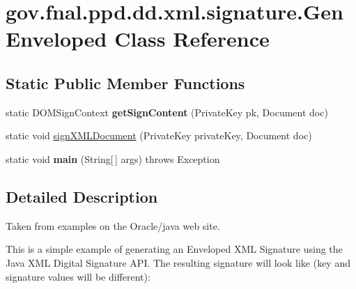\hypertarget{classgov_1_1fnal_1_1ppd_1_1dd_1_1xml_1_1signature_1_1GenEnveloped}{\section{gov.\-fnal.\-ppd.\-dd.\-xml.\-signature.\-Gen\-Enveloped Class Reference}
\label{classgov_1_1fnal_1_1ppd_1_1dd_1_1xml_1_1signature_1_1GenEnveloped}
}
\subsection*{Static Public Member Functions}
\begin{DoxyCompactItemize}
\item 
\hypertarget{classgov_1_1fnal_1_1ppd_1_1dd_1_1xml_1_1signature_1_1GenEnveloped_a14df81eeaa8d9607d12ae959e4f45cff}{static D\-O\-M\-Sign\-Context {\bfseries get\-Sign\-Content} (Private\-Key pk, Document doc)}\label{classgov_1_1fnal_1_1ppd_1_1dd_1_1xml_1_1signature_1_1GenEnveloped_a14df81eeaa8d9607d12ae959e4f45cff}

\item 
static void \hyperlink{classgov_1_1fnal_1_1ppd_1_1dd_1_1xml_1_1signature_1_1GenEnveloped_a86010943e39ea4f238731c3b6890033e}{sign\-X\-M\-L\-Document} (Private\-Key private\-Key, Document doc)
\item 
\hypertarget{classgov_1_1fnal_1_1ppd_1_1dd_1_1xml_1_1signature_1_1GenEnveloped_a16023580ac338dc85c74053b151ad680}{static void {\bfseries main} (String\mbox{[}$\,$\mbox{]} args)  throws Exception }\label{classgov_1_1fnal_1_1ppd_1_1dd_1_1xml_1_1signature_1_1GenEnveloped_a16023580ac338dc85c74053b151ad680}

\end{DoxyCompactItemize}


\subsection{Detailed Description}
Taken from examples on the Oracle/java web site.

This is a simple example of generating an Enveloped X\-M\-L Signature using the Java X\-M\-L Digital Signature A\-P\-I. The resulting signature will look like (key and signature values will be different)\-:


